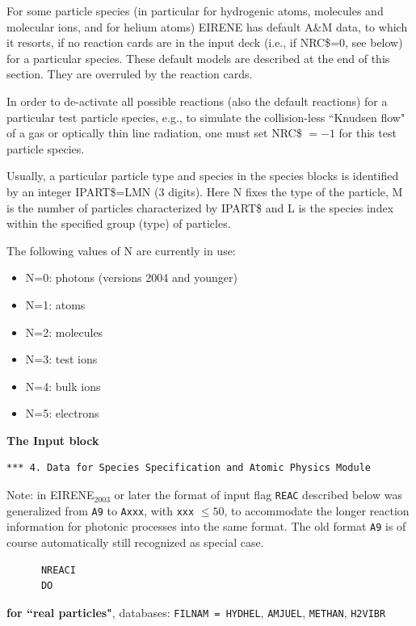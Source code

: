 For some particle species (in particular for hydrogenic atoms, molecules and
molecular ions, and for helium atoms) EIRENE has default A\&M data, to which it
resorts, if no reaction cards are in the input deck (i.e., if NRC\$=0, see
below) for a particular species.
These default models are described at the end of this section.
They are overruled by the reaction cards.

In order to de-activate all possible reactions (also the default reactions) for
a particular test particle species, e.g., to simulate the collision-less
``Knudsen flow" of a gas or optically thin line radiation, one must set NRC\$
$=-1$ for this test particle species.

\medskip

Usually, a particular particle type and species in the species blocks is
identified by an integer IPART\$=LMN (3 digits).
Here N fixes the type of the particle, M is the number of particles
characterized by IPART\$ and L is the species index within the specified group
(type) of particles.

The following values of N are currently in use:
\begin{itemize}
  \item N=0: photons (versions 2004 and younger)
  \item N=1: atoms
  \item N=2:
        molecules
  \item N=3: test ions
  \item N=4: bulk ions
  \item N=5: electrons
\end{itemize}

\textbf{The Input block} 

\begin{lstlisting}
*** 4. Data for Species Specification and Atomic Physics Module
\end{lstlisting} 

Note: in EIRENE$_{2003}$ or later the format of input flag
\lstinline|REAC| described below was generalized from
\lstinline|A9|  to \lstinline|Axxx|, with
\lstinline|xxx| $\leq 50$,  to accommodate the longer reaction
information for photonic processes into the same format.
The old format \lstinline|A9| is of course automatically still
recognized as special case.

\begin{lstlisting}
      NREACI
      DO
\end{lstlisting}

\textbf{for ``real particles"}, databases: \lstinline|FILNAM = HYDHEL|,
\lstinline|AMJUEL|, \lstinline|METHAN|, \lstinline|H2VIBR|

